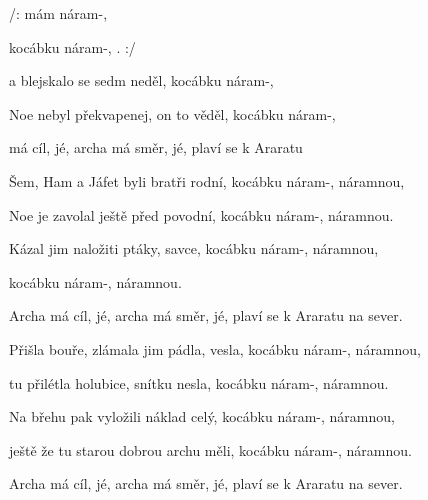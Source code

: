 

\zr
/:  mám  náram-,  

kocábku náram-, . :/
\kr

\zs
{} a blejskalo se sedm neděl,
kocábku náram-, 

Noe nebyl překvapenej, on to věděl,
kocábku náram-, 
\ks

\zr  \kr

\zr
{} má cíl, jé, archa má směr, jé,
plaví se k Araratu 
\kr

\zr  \kr

\zs
Šem, Ham a Jáfet byli bratři rodní,
kocábku náram-, náramnou,

Noe je zavolal ještě před povodní,
kocábku náram-, náramnou.
\ks

\zs
Kázal jim naložiti ptáky, savce,
kocábku náram-, náramnou,

kocábku náram-, náramnou.
\ks

\zr  \kr

\zr
Archa má cíl, jé, archa má směr, jé,
plaví se k Araratu na sever.
\kr

\zr  \kr

\zs
Přišla bouře, zlámala jim pádla, vesla,
kocábku náram-, náramnou,

tu přilétla holubice, snítku nesla,
kocábku náram-, náramnou.
\ks

\zs
Na břehu pak vyložili náklad celý,
kocábku náram-, náramnou,

ještě že tu starou dobrou archu měli,
kocábku náram-, náramnou.
\ks

\zr  \kr

\zr
Archa má cíl, jé, archa má směr, jé,
plaví se k Araratu na sever.
\kr

\zr  \kr

\kp





